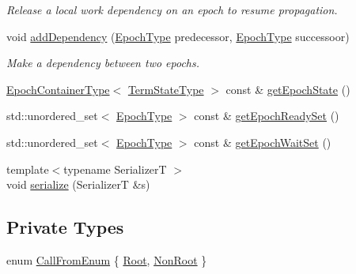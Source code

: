 \begin{DoxyCompactItemize}
\begin{DoxyCompactList}\small\item\em Release a local work dependency on an epoch to resume propagation. \end{DoxyCompactList}\item 
void \hyperlink{structvt_1_1term_1_1_termination_detector_a18685d6c5c81e5f1c73d92891cef601b}{add\+Dependency} (\hyperlink{namespacevt_a81d11b28122d43bf9834577e4a06440f}{Epoch\+Type} predecessor, \hyperlink{namespacevt_a81d11b28122d43bf9834577e4a06440f}{Epoch\+Type} successoor)
\begin{DoxyCompactList}\small\item\em Make a dependency between two epochs. \end{DoxyCompactList}\item 
\hyperlink{structvt_1_1term_1_1_termination_detector_a69e2615b61e072977463eea5b20b7933}{Epoch\+Container\+Type}$<$ \hyperlink{structvt_1_1term_1_1_term_action_ae4c635b69751d887666814700ed64d65}{Term\+State\+Type} $>$ const  \& \hyperlink{structvt_1_1term_1_1_termination_detector_a185004af9f842c58258128456ef27160}{get\+Epoch\+State} ()
\item 
std\+::unordered\+\_\+set$<$ \hyperlink{namespacevt_a81d11b28122d43bf9834577e4a06440f}{Epoch\+Type} $>$ const  \& \hyperlink{structvt_1_1term_1_1_termination_detector_a8eb6730fc343957d0a788919b641762e}{get\+Epoch\+Ready\+Set} ()
\item 
std\+::unordered\+\_\+set$<$ \hyperlink{namespacevt_a81d11b28122d43bf9834577e4a06440f}{Epoch\+Type} $>$ const  \& \hyperlink{structvt_1_1term_1_1_termination_detector_aed77c0e79a681705e941314e7415df35}{get\+Epoch\+Wait\+Set} ()
\item 
{\footnotesize template$<$typename SerializerT $>$ }\\void \hyperlink{structvt_1_1term_1_1_termination_detector_a8736b208710ec6f7cfa1dd09a9205cab}{serialize} (SerializerT \&s)
\end{DoxyCompactItemize}
\subsection*{Private Types}
\begin{DoxyCompactItemize}
\item 
enum \hyperlink{structvt_1_1term_1_1_termination_detector_a4f3ede9a87f39d86e85f92b36a6c6a30}{Call\+From\+Enum} \{ \hyperlink{structvt_1_1term_1_1_termination_detector_a4f3ede9a87f39d86e85f92b36a6c6a30a4beac8e3ddc4064785a61aa7949e3bda}{Root}, 
\hyperlink{structvt_1_1term_1_1_termination_detector_a4f3ede9a87f39d86e85f92b36a6c6a30a73c8bf8079c6c90553937f74f98c99fc}{Non\+Root}
 \}
\end{DoxyCompactItemize}
